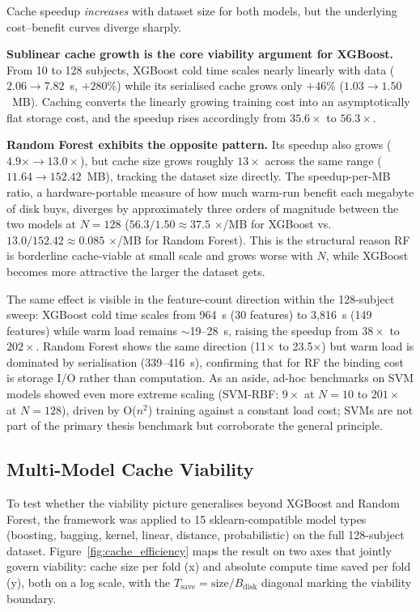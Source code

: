 Cache speedup \textit{increases} with dataset size for both models, but the
underlying cost--benefit curves diverge sharply.

\textbf{Sublinear cache growth is the core viability argument for XGBoost.}
From 10 to 128 subjects, XGBoost cold time scales nearly linearly with data
($2.06 \to 7.82$~s, $+280\%$) while its serialised cache grows only $+46\%$
($1.03 \to 1.50$~MB). Caching converts the linearly growing training cost
into an asymptotically flat storage cost, and the speedup rises accordingly
from $35.6\times$ to $56.3\times$.

\textbf{Random Forest exhibits the opposite pattern.} Its speedup also grows
($4.9\times \to 13.0\times$), but cache size grows roughly $13\times$ across
the same range ($11.64 \to 152.42$~MB), tracking the dataset size directly.
The speedup-per-MB ratio, a hardware-portable measure of how much warm-run
benefit each megabyte of disk buys, diverges by approximately three orders
of magnitude between the two models at $N=128$ ($56.3 / 1.50 \approx 37.5$
$\times$/MB for XGBoost vs.\ $13.0 / 152.42 \approx 0.085$ $\times$/MB for
Random Forest). This is the structural reason RF is borderline cache-viable
at small scale and grows worse with $N$, while XGBoost becomes more attractive
the larger the dataset gets.

The same effect is visible in the feature-count direction within the
128-subject sweep: XGBoost cold time scales from 964~s (30 features) to
3{,}816~s (149 features) while warm load remains $\sim$19--28~s, raising the
speedup from $38\times$ to $202\times$. Random Forest shows the same
direction (11$\times$ to 23.5$\times$) but warm load is dominated by
serialisation (339--416~s), confirming that for RF the binding cost is
storage I/O rather than computation. As an aside, ad-hoc benchmarks on SVM
models showed even more extreme scaling (SVM-RBF: $9\times$ at $N{=}10$ to
$201\times$ at $N{=}128$), driven by O($n^2$) training against a constant
load cost; SVMs are not part of the primary thesis benchmark but corroborate
the general principle.

\subsection{Multi-Model Cache Viability}
\label{sec:results_viability}

To test whether the viability picture generalises beyond XGBoost and Random
Forest, the framework was applied to 15 sklearn-compatible model types
(boosting, bagging, kernel, linear, distance, probabilistic) on the full
128-subject dataset. Figure~\ref{fig:cache_efficiency} maps the result on
two axes that jointly govern viability: cache size per fold (x) and absolute
compute time saved per fold (y), both on a log scale, with the
$T_\text{save} = \text{size}/B_\text{disk}$ diagonal marking the viability
boundary.

